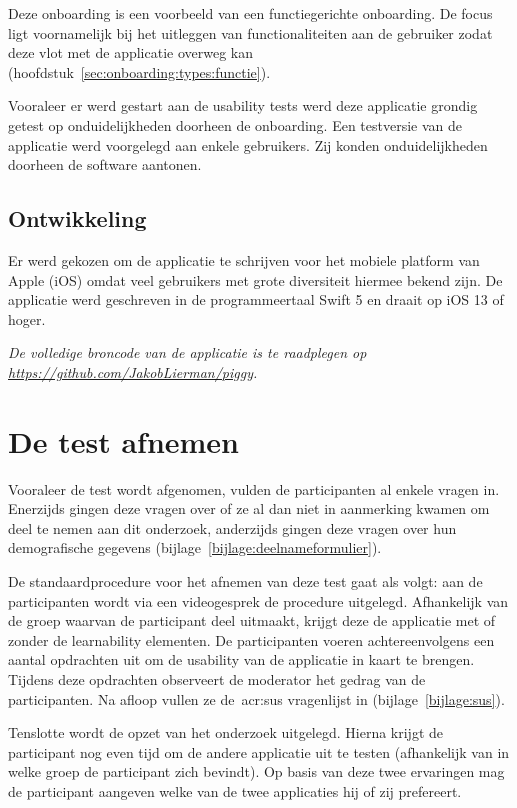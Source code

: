 Deze onboarding is een voorbeeld van een functiegerichte onboarding. De focus ligt voornamelijk bij het uitleggen van functionaliteiten aan de gebruiker zodat deze vlot met de applicatie overweg kan (hoofdstuk~\ref{sec:onboarding:types:functie}).

Vooraleer er werd gestart aan de usability tests werd deze applicatie grondig getest op onduidelijkheden doorheen de onboarding. Een testversie van de applicatie werd voorgelegd aan enkele gebruikers. Zij konden onduidelijkheden doorheen de software aantonen.

\subsection{Ontwikkeling}
\label{sec:applicatie:ontwikkeling}

Er werd gekozen om de applicatie te schrijven voor het mobiele platform van Apple (iOS) omdat veel gebruikers met grote diversiteit hiermee bekend zijn. De applicatie werd geschreven in de programmeertaal Swift 5 en draait op iOS 13 of hoger.

\textit{De volledige broncode van de applicatie is te raadplegen op \url{https://github.com/JakobLierman/piggy}.}

\section{De test afnemen}
\label{sec:test-afnemen}

Vooraleer de test wordt afgenomen, vulden de participanten al enkele vragen in. Enerzijds gingen deze vragen over of ze al dan niet in aanmerking kwamen om deel te nemen aan dit onderzoek, anderzijds gingen deze vragen over hun demografische gegevens (bijlage~\ref{bijlage:deelnameformulier}).

De standaardprocedure voor het afnemen van deze test gaat als volgt: aan de participanten wordt via een videogesprek de procedure uitgelegd. Afhankelijk van de groep waarvan de participant deel uitmaakt, krijgt deze de applicatie met of zonder de learnability elementen. De participanten voeren achtereenvolgens een aantal opdrachten uit om de usability van de applicatie in kaart te brengen. Tijdens deze opdrachten observeert de moderator het gedrag van de participanten. Na afloop vullen ze de~\acrshort{acr:sus} vragenlijst in (bijlage~\ref{bijlage:sus}).

Tenslotte wordt de opzet van het onderzoek uitgelegd. Hierna krijgt de participant nog even tijd om de andere applicatie uit te testen (afhankelijk van in welke groep de participant zich bevindt). Op basis van deze twee ervaringen mag de participant aangeven welke van de twee applicaties hij of zij prefereert.
